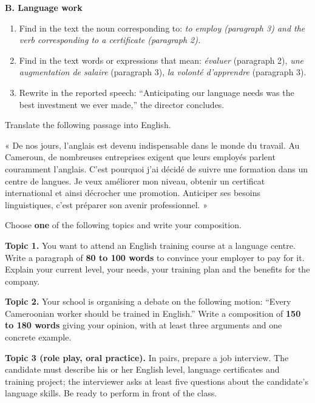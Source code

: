 \documentclass[11pt]{article}
\newcommand{\eng}[1]{\ifmmode\text{\textit{#1}}\else\begingroup\selectlanguage{english}\itshape #1\endgroup\fi}
\begin{document}
\begin{exercice}
\textbf{B. Language work}
\begin{enumerate}
\item Find in the text the noun corresponding to: \eng{to employ} (paragraph 3) and the verb corresponding to \eng{a certificate} (paragraph 2).
\item Find in the text words or expressions that mean: \emph{évaluer} (paragraph 2), \emph{une augmentation de salaire} (paragraph 3), \emph{la volonté d'apprendre} (paragraph 3).
\item Rewrite in the reported speech: “Anticipating our language needs was the best investment we ever made,” the director concludes.
\end{enumerate}
\end{exercice}

\begin{exercice}
Translate the following passage into English.

« De nos jours, l'anglais est devenu indispensable dans le monde du travail. Au Cameroun, de nombreuses entreprises exigent que leurs employés parlent couramment l'anglais. C'est pourquoi j'ai décidé de suivre une formation dans un centre de langues. Je veux améliorer mon niveau, obtenir un certificat international et ainsi décrocher une promotion. Anticiper ses besoins linguistiques, c'est préparer son avenir professionnel. »
\end{exercice}

\begin{exercice}
Choose \textbf{one} of the following topics and write your composition.

\textbf{Topic 1.} You want to attend an English training course at a language centre. Write a paragraph of \textbf{80 to 100 words} to convince your employer to pay for it. Explain your current level, your needs, your training plan and the benefits for the company.

\textbf{Topic 2.} Your school is organising a debate on the following motion: “Every Cameroonian worker should be trained in English.” Write a composition of \textbf{150 to 180 words} giving your opinion, with at least three arguments and one concrete example.

\textbf{Topic 3 (role play, oral practice).} In pairs, prepare a job interview. The candidate must describe his or her English level, language certificates and training project; the interviewer asks at least five questions about the candidate's language skills. Be ready to perform in front of the class.
\end{exercice}
\end{document}
